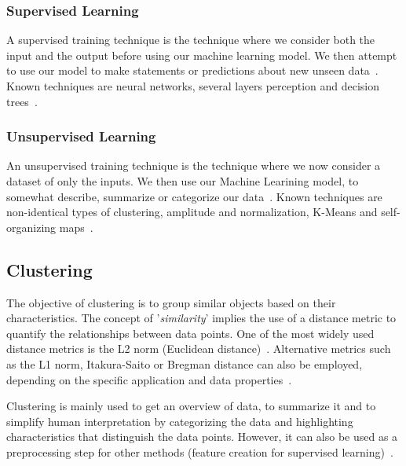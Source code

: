 \documentclass[10pt,twocolumn,letterpaper]{article}
\begin{document}

\subsubsection{Supervised Learning}\label{subsubsec:supervised-learning}

A supervised training technique is the technique where we consider both the
input and the output before using our machine learning model. We then attempt
to use our model to make statements or predictions about new unseen
data~\cite{deuschle2019}. Known techniques are neural networks, several layers
perception and decision trees~\cite{kushawahAndYadav2016}.


\subsubsection{Unsupervised Learning}\label{subsubsec:unsupervised-learning}

An unsupervised training technique is the technique where we now consider a
dataset of only the inputs. We then use our Machine Learining model, to
somewhat describe, summarize or categorize our data~\cite{deuschle2019}. Known
techniques are non-identical types of clustering, amplitude and normalization,
K-Means and self-organizing maps~\cite{kushawahAndYadav2016}.


\subsection{Clustering}\label{subsec:clustering}

The objective of clustering is to group similar objects based on their
characteristics. The concept of '\textit{similarity}' implies the use of a
distance metric to quantify the relationships between data points. One of the
most widely used distance metrics is the L2 norm (Euclidean
distance)~\cite{deuschle2019}. Alternative metrics such as the L1 norm,
Itakura-Saito or Bregman distance can also be employed, depending on the
specific application and data properties~\cite{Jain2010651}.

Clustering is mainly used to get an overview of data, to summarize it and to
simplify human interpretation by categorizing the data and highlighting
characteristics that distinguish the data points. However, it can also be used
as a preprocessing step for other methods (\eg feature creation for supervised
learning)~\cite{Jain2010651}.
\end{document}
